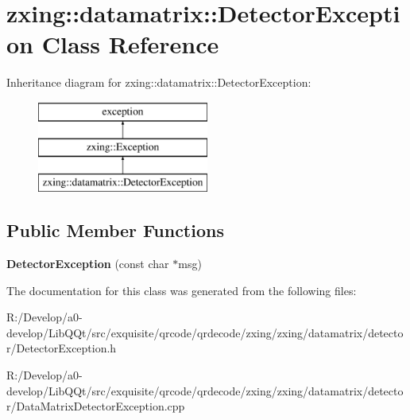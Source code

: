 \hypertarget{classzxing_1_1datamatrix_1_1_detector_exception}{}\section{zxing\+:\+:datamatrix\+:\+:Detector\+Exception Class Reference}
\label{classzxing_1_1datamatrix_1_1_detector_exception}
Inheritance diagram for zxing\+:\+:datamatrix\+:\+:Detector\+Exception\+:\begin{figure}[H]
\begin{center}
\leavevmode
\includegraphics[height=3.000000cm]{classzxing_1_1datamatrix_1_1_detector_exception}
\end{center}
\end{figure}
\subsection*{Public Member Functions}
\begin{DoxyCompactItemize}
\item 
\mbox{\label{classzxing_1_1datamatrix_1_1_detector_exception_ab1f9d1438b8347c75525c2a051578da8}} 
{\bfseries Detector\+Exception} (const char $\ast$msg)
\end{DoxyCompactItemize}


The documentation for this class was generated from the following files\+:\begin{DoxyCompactItemize}
\item 
R\+:/\+Develop/a0-\/develop/\+Lib\+Q\+Qt/src/exquisite/qrcode/qrdecode/zxing/zxing/datamatrix/detector/Detector\+Exception.\+h\item 
R\+:/\+Develop/a0-\/develop/\+Lib\+Q\+Qt/src/exquisite/qrcode/qrdecode/zxing/zxing/datamatrix/detector/Data\+Matrix\+Detector\+Exception.\+cpp\end{DoxyCompactItemize}
